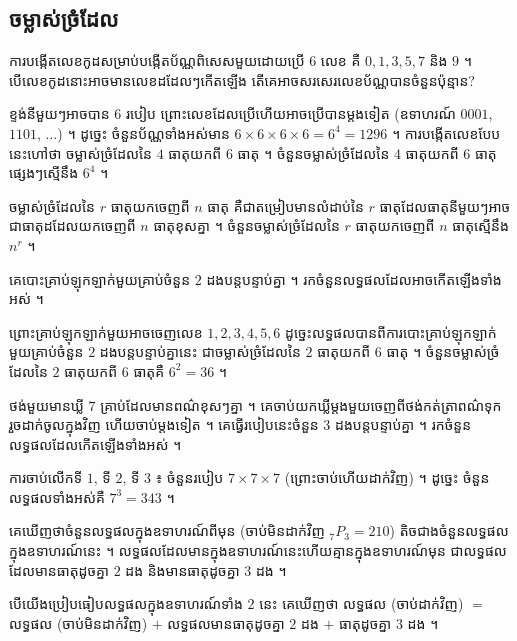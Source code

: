 \subsection{ចម្លាស់ច្រំដែល}

\begin{example}[ឧទាហរណ៍ ១]
ការបង្កើតលេខកូដសម្រាប់បង្កើតប័ណ្ណពិសេសមួយដោយប្រើ $6$ លេខ គឺ $0, 1, 3, 5, 7$ និង $9$ ។ បើលេខកូដនោះអាចមានលេខដដែលៗកើតឡើង តើគេអាចសរសេរលេខប័ណ្ណបានចំនួនប៉ុន្មាន?
\end{example}
ខ្ទង់នីមួយៗអាចបាន $6$ របៀប ព្រោះលេខដែលប្រើហើយអាចប្រើបានម្ដងទៀត (ឧទាហរណ៍ $0001$, $1101$, $\dots$) ។ ដូច្នេះ ចំនួនប័ណ្ណទាំងអស់មាន $6\times 6\times 6\times 6 = 6^4 = 1296$ ។ ការបង្កើតលេខបែបនេះហៅថា ចម្លាស់ច្រំដែលនៃ $4$ ធាតុយកពី $6$ ធាតុ ។ ចំនួនចម្លាស់ច្រំដែលនៃ $4$ ធាតុយកពី $6$ ធាតុផ្សេងៗស្មើនឹង $6^4$ ។

\begin{formulaBox}[ជាទូទៅ]
ចម្លាស់ច្រំដែលនៃ $r$ ធាតុយកចេញពី $n$ ធាតុ គឺជាតម្រៀបមានលំដាប់នៃ $r$ ធាតុដែលធាតុនីមួយៗអាចជាធាតុដដែលយកចេញពី $n$ ធាតុខុសគ្នា ។ ចំនួនចម្លាស់ច្រំដែលនៃ $r$ ធាតុយកចេញពី $n$ ធាតុស្មើនឹង $n^r$ ។
\end{formulaBox}

\begin{example}[ឧទាហរណ៍ ២]
គេបោះគ្រាប់ឡុកឡាក់មួយគ្រាប់ចំនួន $2$ ដងបន្តបន្ទាប់គ្នា ។ រកចំនួនលទ្ធផលដែលអាចកើតឡើងទាំងអស់ ។
\end{example}
ព្រោះគ្រាប់ឡុកឡាក់មួយអាចចេញលេខ $1, 2, 3, 4, 5, 6$ ដូច្នេះលទ្ធផលបានពីការបោះគ្រាប់ឡុកឡាក់មួយគ្រាប់ចំនួន $2$ ដងបន្តបន្ទាប់គ្នានេះ ជាចម្លាស់ច្រំដែលនៃ $2$ ធាតុយកពី $6$ ធាតុ ។ ចំនួនចម្លាស់ច្រំដែលនៃ $2$ ធាតុយកពី $6$ ធាតុគឺ $6^2 = 36$ ។

\begin{example}[លំហាត់គំរូ]
ថង់មួយមានឃ្លី $7$ គ្រាប់ដែលមានពណ៌ខុសៗគ្នា ។ គេចាប់យកឃ្លីម្ដងមួយចេញពីថង់កត់ត្រាពណ៌ទុក រួចដាក់ចូលក្នុងវិញ ហើយចាប់ម្ដងទៀត ។ គេធ្វើរបៀបនេះចំនួន $3$ ដងបន្តបន្ទាប់គ្នា ។ រកចំនួនលទ្ធផលដែលកើតឡើងទាំងអស់ ។
\end{example}
\ans
ការចាប់លើកទី $1$, ទី $2$, ទី $3$ ៖ ចំនួនរបៀប $7\times 7\times 7$ (ព្រោះចាប់ហើយដាក់វិញ) ។ ដូច្នេះ ចំនួនលទ្ធផលទាំងអស់គឺ $7^3 = 343$ ។

គេឃើញថាចំនួនលទ្ធផលក្នុងឧទាហរណ៍ពីមុន (ចាប់មិនដាក់វិញ ${}_7P_3 = 210$) តិចជាងចំនួនលទ្ធផលក្នុងឧទាហរណ៍នេះ ។ លទ្ធផលដែលមានក្នុងឧទាហរណ៍នេះហើយគ្មានក្នុងឧទាហរណ៍មុន ជាលទ្ធផលដែលមានធាតុដូចគ្នា $2$ ដង និងមានធាតុដូចគ្នា $3$ ដង ។

\begin{note}[សម្គាល់]
បើយើងប្រៀបធៀបលទ្ធផលក្នុងឧទាហរណ៍ទាំង $2$ នេះ គេឃើញថា លទ្ធផល (ចាប់ដាក់វិញ) $=$ លទ្ធផល (ចាប់មិនដាក់វិញ) $+$ លទ្ធផលមានធាតុដូចគ្នា $2$ ដង $+$ ធាតុដូចគ្នា $3$ ដង ។
\end{note}

